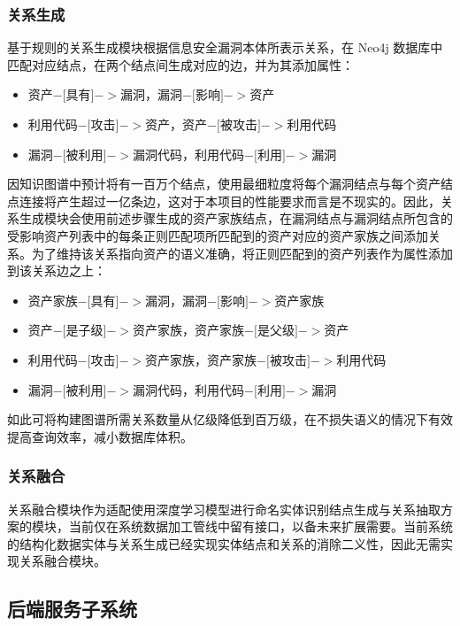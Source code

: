 \documentclass[a4paper,AutoFakeBold,oneside,12pt]{book}
\begin{document}
\subsubsection{关系生成\label{关系生成}}

基于规则的关系生成模块根据信息安全漏洞本体所表示关系，在 Neo4j 数据库中匹配对应结点，在两个结点间生成对应的边，并为其添加属性：
\begin{itemize}
	\item 资产$-[$具有$]->$漏洞，漏洞$-[$影响$]->$资产
	\item 利用代码$-[$攻击$]->$资产，资产$-[$被攻击$]->$利用代码
	\item 漏洞$-[$被利用$]->$漏洞代码，利用代码$-[$利用$]->$漏洞
\end{itemize}

因知识图谱中预计将有一百万个结点，使用最细粒度将每个漏洞结点与每个资产结点连接将产生超过一亿条边，这对于本项目的性能要求而言是不现实的。因此，关系生成模块会使用前述步骤生成的资产家族结点，在漏洞结点与漏洞结点所包含的受影响资产列表中的每条正则匹配项所匹配到的资产对应的资产家族之间添加关系。为了维持该关系指向资产的语义准确，将正则匹配到的资产列表作为属性添加到该关系边之上：
\begin{itemize}
	\item 资产家族$-[$具有$]->$漏洞，漏洞$-[$影响$]->$资产家族
	\item 资产$-[$是子级$]->$资产家族，资产家族$-[$是父级$]->$资产
	\item 利用代码$-[$攻击$]->$资产家族，资产家族$-[$被攻击$]->$利用代码
	\item 漏洞$-[$被利用$]->$漏洞代码，利用代码$-[$利用$]->$漏洞
\end{itemize}

如此可将构建图谱所需关系数量从亿级降低到百万级，在不损失语义的情况下有效提高查询效率，减小数据库体积。

\subsubsection{关系融合}

关系融合模块作为适配使用深度学习模型进行命名实体识别结点生成与关系抽取方案的模块，当前仅在系统数据加工管线中留有接口，以备未来扩展需要。当前系统的结构化数据实体与关系生成已经实现实体结点和关系的消除二义性，因此无需实现关系融合模块。

\subsection{后端服务子系统}
\end{document}
